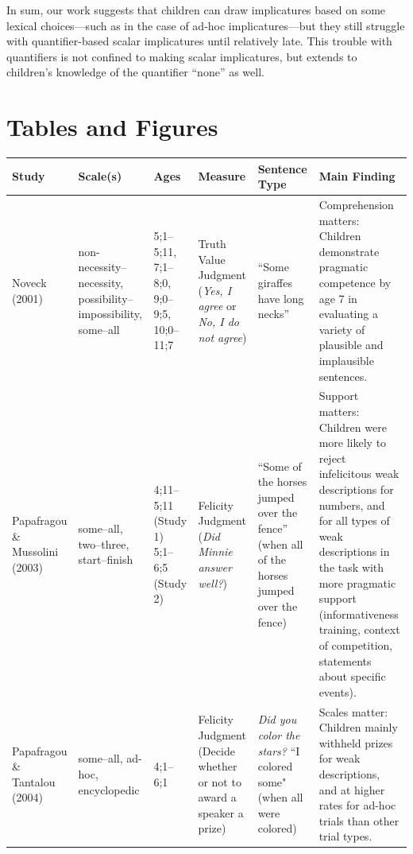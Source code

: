 \documentclass[man]{apa2}
\begin{document}
{In sum, our work suggests that children can draw implicatures based on some lexical choices---such as in the case of ad-hoc implicatures---but they still struggle with quantifier-based scalar implicatures until relatively late. This trouble with quantifiers is not confined to making scalar implicatures, but extends to children's knowledge of the quantifier ``none'' as well.

\section{Tables and Figures}

\begin{landscape}
\begin{table}[!ht]
\footnotesize
\centering
\begin{tabular}{| p{2.2cm} | p{2cm} | p{1.69cm} | p{4.5cm} | p{5cm} | p{7.2cm} |} \hline
{\bf Study} & {\bf Scale(s)} & {\bf Ages} & {\bf Measure} & {\bf Sentence Type} & {\bf Main Finding} \\ \hline
Noveck (2001) & non-necessity--necessity, possibility--impossibility, some--all & 5;1--5;11, 7;1--8;0, 9;0--9;5, 10;0--11;7 & Truth Value Judgment (\textit{Yes, I agree} or \textit{No, I do not agree}) & ``Some giraffes have long necks'' & \parbox[t]{7.2cm}{Comprehension matters: Children demonstrate\\ pragmatic competence by age 7 in evaluating a variety of plausible and implausible sentences.} \\ \hline
\parbox[t]{2.2cm}{Papafragou \&\\Mussolini (2003)} & \parbox[t]{2cm}{some--all,\\two--three,\\start--finish} & \parbox[t]{1.69cm}{4;11--5;11\\(Study 1)\\5;1--6;5\\(Study 2) } &  \parbox[t]{4.5cm}{Felicity Judgment (\textit{Did Minnie\\answer well?})} & ``Some of the horses jumped over the fence'' (when all of the horses jumped over the fence) & Support matters: Children were more likely to reject infelicitous weak descriptions for numbers, and for all types of weak descriptions in the task with more pragmatic support (informativeness training, context of competition, statements about specific events). \\ \hline
\parbox[t]{2.2cm}{Papafragou \&\\Tantalou (2004)} & some--all, ad-hoc, encyclopedic & 4;1--6;1 & Felicity Judgment (Decide whether or not to award a speaker a prize) & \textit{Did you color the stars?} ``I colored some" (when all were colored) & Scales matter: Children mainly withheld prizes for weak descriptions, and at higher rates for ad-hoc trials than other trial types. \\ \hline

\end{tabular}
\end{table}
\end{landscape}}
\end{document}
